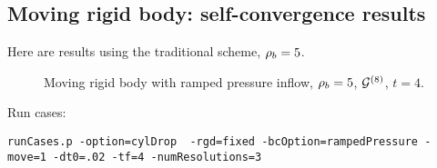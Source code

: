 \documentclass[11pt]{article}
\begin{document}
\subsection{Moving rigid body: self-convergence results}

Here are results using the traditional scheme, ${\rho_b}=5$. 


{
\begin{figure}[hbt]
\newcommand{\figWidth}{6.25cm}
\newcommand{\trimfig}[2]{\trimh{#1}{#2}{0.2}{.0}{.0}{.0}}
\begin{center}\small
\caption{
Moving rigid body with ramped pressure inflow, ${\rho_b}=5$, ${\mathcal G}^{(8)}$, $t=4$.
}
\label{fig:cylDropNonMovingRampedPressure}
\end{center}
\end{figure}
}


Run cases:
\begin{lstlisting}
runCases.p -option=cylDrop  -rgd=fixed -bcOption=rampedPressure -move=1 -dt0=.02 -tf=4 -numResolutions=3
\end{lstlisting}
\end{document}
